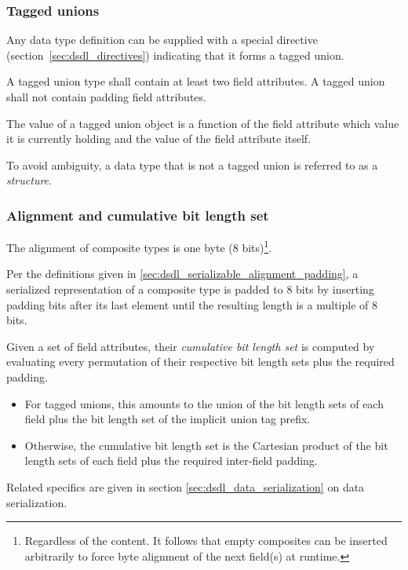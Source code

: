 \subsubsection{Tagged unions}\label{sec:dsdl_composite_tagged_unions}

Any data type definition can be supplied with a special directive (section~\ref{sec:dsdl_directives})
indicating that it forms a tagged union.

A tagged union type shall contain at least two field attributes.
A tagged union shall not contain padding field attributes.

The value of a tagged union object is a function of the field attribute which value it is currently holding
and the value of the field attribute itself.

To avoid ambiguity, a data type that is not a tagged union is referred to as a \emph{structure}.

\subsubsection{Alignment and cumulative bit length set}\label{sec:dsdl_composite_alignment_cumulative_bls}

The alignment of composite types is one byte (8 bits)\footnote{%
    Regardless of the content.
    It follows that empty composites can be inserted arbitrarily to force byte alignment
    of the next field(s) at runtime.
}.

Per the definitions given in \ref{sec:dsdl_serializable_alignment_padding},
a serialized representation of a composite type is padded to 8 bits by inserting padding bits
after its last element until the resulting length is a multiple of 8 bits.

Given a set of field attributes, their \emph{cumulative bit length set} is computed
by evaluating every permutation of their respective bit length sets plus the required padding.
\begin{itemize}
    \item For tagged unions, this amounts to the union of the bit length sets of each field
    plus the bit length set of the implicit union tag prefix.
    \item Otherwise, the cumulative bit length set is the Cartesian product of the bit length sets of each field
    plus the required inter-field padding.
\end{itemize}
Related specifics are given in section \ref{sec:dsdl_data_serialization} on data serialization.

